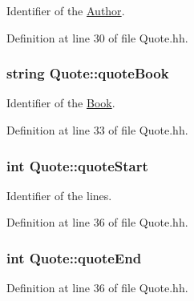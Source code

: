 Identifier of the \hyperlink{class_author}{Author}. 



Definition at line 30 of file Quote.\+hh.

\subsubsection[{\texorpdfstring{quote\+Book}{quoteBook}}]{\setlength{\rightskip}{0pt plus 5cm}string Quote\+::quote\+Book\hspace{0.3cm}{\ttfamily [private]}}\hypertarget{class_quote_a7e6968e086bdd45b40627a37ecbbf6fc}{}\label{class_quote_a7e6968e086bdd45b40627a37ecbbf6fc}


Identifier of the \hyperlink{class_book}{Book}. 



Definition at line 33 of file Quote.\+hh.

\subsubsection[{\texorpdfstring{quote\+Start}{quoteStart}}]{\setlength{\rightskip}{0pt plus 5cm}int Quote\+::quote\+Start\hspace{0.3cm}{\ttfamily [private]}}\hypertarget{class_quote_ac426122ac24638740b2a5c5e8342e8c9}{}\label{class_quote_ac426122ac24638740b2a5c5e8342e8c9}


Identifier of the lines. 



Definition at line 36 of file Quote.\+hh.

\subsubsection[{\texorpdfstring{quote\+End}{quoteEnd}}]{\setlength{\rightskip}{0pt plus 5cm}int Quote\+::quote\+End\hspace{0.3cm}{\ttfamily [private]}}\hypertarget{class_quote_aa5953a477b96183c8dc2fc8a42001c29}{}\label{class_quote_aa5953a477b96183c8dc2fc8a42001c29}


Definition at line 36 of file Quote.\+hh.

